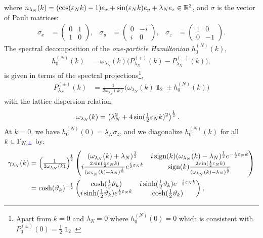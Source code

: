 \documentclass[a4paper, 11pt]{article}
\DeclareMathOperator{\1}{\mathds{1}}
\DeclareMathOperator{\sign}{\textup{sign}}
\begin{document}
where $n_{\lambda_{N}}(k) = (\cos(\varepsilon_{N}k)-1)e_{x} + \sin(\varepsilon_{N}k)e_{y} + \lambda_{N}e_{z}\in\mathbb{R}^{3}$, and $\sigma$ is the vector of Pauli matrices:
\begin{align}
\label{eq:pauli}
\sigma_{x} & = \begin{pmatrix} 0 & 1 \\ 1 & 0 \end{pmatrix}, & \sigma_{y} & = \begin{pmatrix} 0 & -i \\ i & 0 \end{pmatrix}, & \sigma_{z} & = \begin{pmatrix} 1 & 0 \\ 0 & -1 \end{pmatrix}.
\end{align}
The spectral decomposition of the \textit{one-particle Hamiltonian} $h^{(N)}_{0}(k)$,
\begin{align}
\label{eq:1pHdiag}
h^{(N)}_{0}(k) & = \omega_{\lambda_{N}}(k)\Big(P^{(+)}_{\lambda_{N}}(k)-P^{(-)}_{\lambda_{N}}(k)\Big),
\end{align}
is given in terms of the spectral projections\footnote{Apart from $k=0$ and $\lambda_{N}=0$ where $h^{(N)}_{0}(0)=0$ which is consistent with $P^{(\pm)}_{0}(0) = \tfrac{1}{2}\1_{2}$.},
\begin{align}
\label{eq:1pproj}
P^{(\pm)}_{\lambda_{N}}(k) & = \tfrac{1}{2\omega_{\lambda_{N}}(k)}\big(\omega_{\lambda_{N}}(k)\1_{2}\pm h^{(N)}_{0}(k)\big)
\end{align}
with the lattice dispersion relation:
\begin{align}
\label{eq:lattdisp}
\omega_{\lambda_{N}}(k) & = \left(\lambda_{N}^{2}+4\sin(\tfrac{1}{2}\varepsilon_{N}k)^{2}\right)^{\frac{1}{2}}.
\end{align}
At $k=0$, we have $h^{(N)}_{0}(0)=\lambda_{N}\sigma_{z}$, and we diagonalize $h^{(N)}_{0}(k)$ for all $k\in\Gamma_{N,{\color{blue}\pm}}$ by:
\begin{align}
\label{eq:stagHbog}
\gamma_{\lambda_{N}}(k) & = \Big(\tfrac{1}{2\omega_{\lambda_{N}}(k)}\Big)^{\!\frac{1}{2}}\begin{pmatrix} (\omega_{\lambda_{N}}(k)+\lambda_{N})^{\frac{1}{2}} & i\sign(k)(\omega_{\lambda_{N}}(k)-\lambda_{N})^{\frac{1}{2}}e^{-\frac{i}{2}\vep_{N}k} \\ i\frac{2\sin(\frac{1}{2}\vep_{N}k)}{(\omega_{\lambda_{N}}(k)+\lambda_{N})^{\frac{1}{2}}}e^{\frac{i}{2}\vep_{N}k} & \sign(k)\frac{2\sin(\frac{1}{2}\vep_{N}k)}{(\omega_{\lambda_{N}}(k)-\lambda_{N})^{\frac{1}{2}}} \end{pmatrix} \\ \nonumber
& = \cosh(\vartheta_{k})^{-\frac{1}{2}}\begin{pmatrix} \cosh(\frac{1}{2}\vartheta_{k}) & i\sinh(\frac{1}{2}\vartheta_{k})e^{-\frac{i}{2}\vep_{N}k} \\ i\sinh(\frac{1}{2}\vartheta_{k})e^{\frac{i}{2}\vep_{N}k} & \cosh(\frac{1}{2}\vartheta_{k}) \end{pmatrix},
\end{align}
\end{document}
